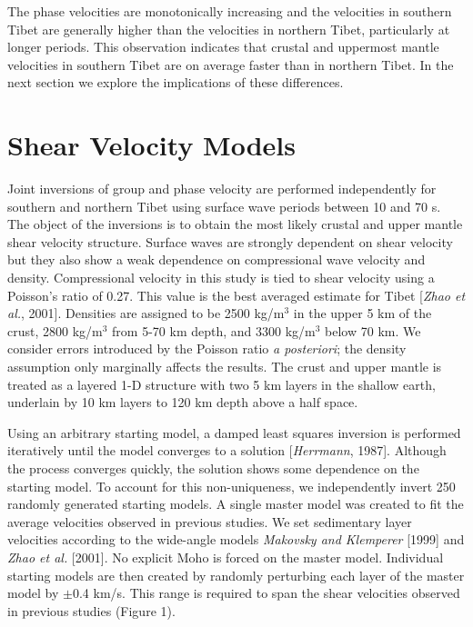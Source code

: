 \documentclass[12pt]{article}
\begin{document}
The phase velocities are monotonically increasing and the velocities in southern Tibet are generally higher 
than the velocities in northern Tibet, particularly at longer periods.  This observation indicates that 
crustal and uppermost mantle velocities in southern Tibet are on average faster than in northern Tibet.  In 
the next section we explore the implications of these differences. 

\section{Shear Velocity Models} 

Joint inversions of group and phase velocity are performed independently for southern and northern Tibet 
using surface wave periods between 10 and 70 s.   The object of the inversions is to obtain the most likely 
crustal and upper mantle shear velocity structure.  Surface waves are strongly dependent on shear 
velocity but they also show a weak dependence on compressional wave velocity and density.  Compressional 
velocity in this study is tied to shear velocity using a Poisson's ratio of 0.27.  This value is the best 
averaged estimate for Tibet [{\it Zhao et al.}, 2001].  Densities are assigned to be 2500 kg/m$^3$ in the upper 
5 km of the crust, 2800 kg/m$^3$ from 5-70 km depth, and 3300 kg/m$^3$ below 70 km.  We consider errors 
introduced by the Poisson ratio {\it a posteriori}; the density
assumption only marginally affects the results.  The crust and upper mantle is 
treated as a layered 1-D structure with two 5 km layers in the shallow earth, underlain by 10 km layers to 
120 km depth above a half space. 

Using an arbitrary starting model, a damped least squares inversion is performed iteratively until the model converges to a 
solution [{\it Herrmann}, 1987].  Although the process converges quickly, the solution shows some dependence on the starting model.  
To account for this non-uniqueness, we independently invert 250 randomly generated starting models.  A single master model 
was created to fit the average velocities observed in previous studies.  We set sedimentary layer 
velocities according to the wide-angle models {\it 
Makovsky and Klemperer} [1999] and {\it Zhao et 
al.} [2001].  No explicit Moho is forced on the master model.  Individual starting models are then created 
by randomly perturbing each layer of the master model by $\pm$0.4 km/s.  This range is required to span the 
shear velocities observed in previous studies (Figure 1).
\end{document}
